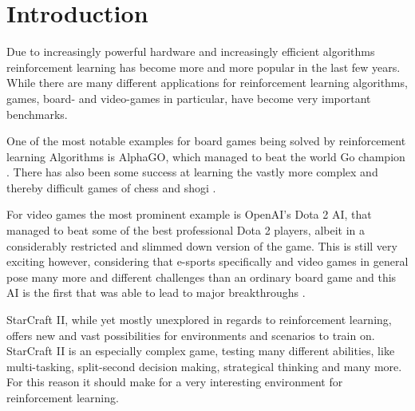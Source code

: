 
\chapter{Introduction} %

\label{chap_intro} %


Due to increasingly powerful hardware and increasingly efficient algorithms reinforcement learning has become more and more popular in the last few years. While there are many different applications for reinforcement learning algorithms, games, board- and video-games in particular, have become very important benchmarks.

One of the most notable examples for board games being solved by reinforcement learning Algorithms is AlphaGO, which managed to beat the world Go champion \citep{DBLP:journals/nature/SilverHMGSDSAPL16}. There has also been some success at learning the vastly more complex and thereby difficult games of chess and shogi \citep{DBLP:journals/corr/abs-1712-01815}.

For video games the most prominent example is OpenAI's Dota 2 AI, that managed to beat some of the best professional Dota 2 players, albeit in a considerably restricted and slimmed down version of the game. This is still very exciting however, considering that e-sports specifically and video games in general pose many more and different challenges than an ordinary board game and this AI is the first that was able to lead to major breakthroughs \citep{blogdota}.

StarCraft II, while yet mostly unexplored in regards to reinforcement learning, offers new and vast possibilities for environments and scenarios to train on. StarCraft II is an especially complex game, testing many different abilities, like multi-tasking, split-second decision making, strategical thinking and many more. For this reason it should make for a very interesting environment for reinforcement learning. 

